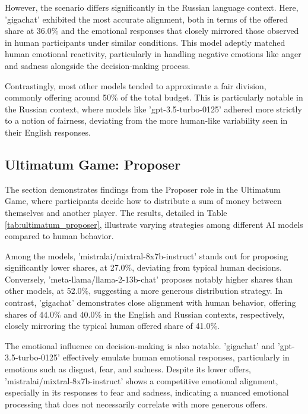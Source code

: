 \documentclass{article}
\begin{document}
However, the scenario differs significantly in the Russian language context. Here, 'gigachat' exhibited the most accurate alignment, both in terms of the offered share at 36.0\% and the emotional responses that closely mirrored those observed in human participants under similar conditions. This model adeptly matched human emotional reactivity, particularly in handling negative emotions like anger and sadness alongside the decision-making process.

Contrastingly, most other models tended to approximate a fair division, commonly offering around 50\% of the total budget. This is particularly notable in the Russian context, where models like 'gpt-3.5-turbo-0125' adhered more strictly to a notion of fairness, deviating from the more human-like variability seen in their English responses.



\subsection{Ultimatum Game: Proposer}

The section demonstrates findings from the Proposer role in the Ultimatum Game, where participants decide how to distribute a sum of money between themselves and another player. The results, detailed in Table \ref{tab:ultimatum_proposer}, illustrate varying strategies among different AI models compared to human behavior.

Among the models, 'mistralai/mixtral-8x7b-instruct' stands out for proposing significantly lower shares, at 27.0\%, deviating from typical human decisions. Conversely, 'meta-llama/llama-2-13b-chat' proposes notably higher shares than other models, at 52.0\%, suggesting a more generous distribution strategy. In contrast, 'gigachat' demonstrates close alignment with human behavior, offering shares of 44.0\% and 40.0\% in the English and Russian contexts, respectively, closely mirroring the typical human offered share of 41.0\%.

The emotional influence on decision-making is also notable. 'gigachat' and 'gpt-3.5-turbo-0125' effectively emulate human emotional responses, particularly in emotions such as disgust, fear, and sadness. Despite its lower offers, 'mistralai/mixtral-8x7b-instruct' shows a competitive emotional alignment, especially in its responses to fear and sadness, indicating a nuanced emotional processing that does not necessarily correlate with more generous offers.
\end{document}
